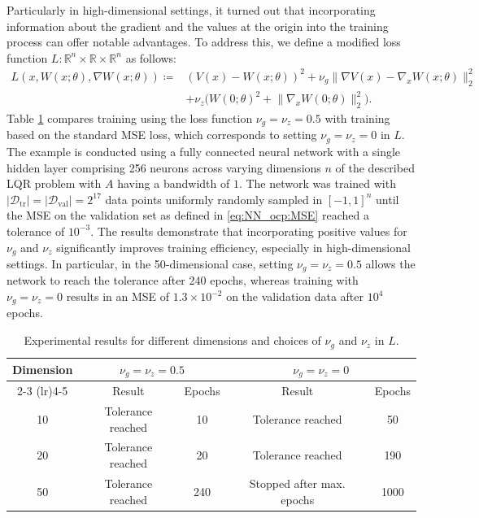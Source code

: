 \documentclass{article}
\newcommand{\R}{\mathbb{R}}
\newcommand{\Rn}{\R^n}
\newcommand{\dataTrain}{\mathcal{D}_{\text{tr}}}
\newcommand{\dataVal}{\mathcal{D}_{\text{val}}}
\begin{document}
Particularly in high-dimensional settings, it turned out that incorporating information about the gradient and the values at the origin into the training process can offer notable advantages. To address this, we define a modified loss function $L \colon \Rn \times \R \times \Rn$ as follows:
\begin{align*}
    L(x, W(x; \theta), \nabla W(x; \theta)) \coloneqq & (V(x) - W(x; \theta))^2  + \nu_g \lVert \nabla V(x) - \nabla_x W(x; \theta) \rVert_2^2 \\ & + \nu_z \Big( W(0; \theta)^2 +  \lVert \nabla_x W(0; \theta) \rVert_2^2 \Big). 
\end{align*}
Table \ref{tab:comparison_loss} compares training using the loss function \( \nu_g = \nu_z = 0.5 \) with training based on the standard MSE loss, which corresponds to setting \( \nu_g = \nu_z = 0 \) in $L$. The example is conducted using a fully connected neural network with a single hidden layer comprising 256 neurons across varying dimensions $n$ of the described LQR problem with $A$ having a bandwidth of $1$. The network was trained with $| \dataTrain | = | \dataVal | = 2^{17}$ data points uniformly randomly sampled in $[-1,1]^n$ until the MSE on the validation set as defined in \eqref{eq:NN_ocp:MSE} reached a tolerance of $10^{-3}$. The results demonstrate that incorporating positive values for $\nu_g $ and $ \nu_z $   significantly improves training efficiency, especially in high-dimensional settings. In particular, in the 50-dimensional case, setting $\nu_g = \nu_z = 0.5 $ allows the network to reach the tolerance after 240 epochs, whereas training with $\nu_g = \nu_z = 0$ results in an MSE of $1.3 \times 10^{-2}$ on the validation data after $10^4$ epochs.

\begin{table}[h]
    \centering
    \begin{tabular}{c|cc|cc}
        \toprule
        Dimension & \multicolumn{2}{c|}{$\nu_g = \nu_z = 0.5$} & \multicolumn{2}{c}{$\nu_g = \nu_z = 0$} \\
        \cmidrule(lr){2-3} \cmidrule(lr){4-5}
        & Result & Epochs & Result & Epochs \\
        \midrule
        10  & Tolerance reached & 10 & Tolerance reached & {50} \\
        20  & Tolerance reached & 20 & Tolerance reached & {190} \\
        50  & Tolerance reached & {240}  & Stopped after max. epochs & 1000 \\
        \bottomrule
    \end{tabular}
    \caption{Experimental results for different dimensions and choices of $\nu_g$ and $\nu_z$ in $L$.}
    \label{tab:comparison_loss}
\end{table}
\end{document}
